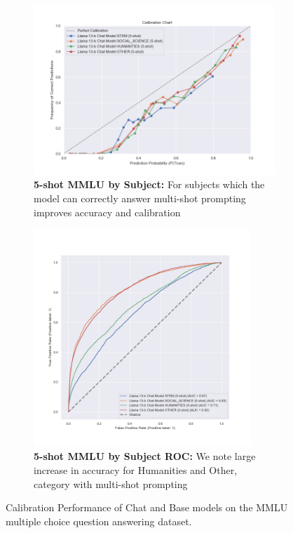 \documentclass[11pt]{article}
\begin{document}
\begin{figure}
     \hfill
     \begin{subfigure}[b]{0.60\textwidth}
         \centering
         \includegraphics[width=1.1\textwidth]{figures/5-shot-MMLU-subjects.png}
         \caption{\textbf{5-shot MMLU by Subject:}  For subjects which the model can correctly 
         answer multi-shot prompting improves accuracy and calibration}
         \label{fig:5-shot-logicqa}
     \end{subfigure}     
    \hfill 
     \begin{subfigure}[b]{0.38\textwidth}
         \centering \includegraphics[width=0.9\textwidth]{figures/5-shot-MMLU-subjects-roc.png}
         \caption{\textbf{5-shot MMLU by Subject ROC:} We note large increase in accuracy for 
         Humanities and Other, category with multi-shot prompting}
         \label{fig:0-shot-MMLU}
    \end{subfigure} 
    
        \caption{Calibration Performance of Chat and Base models on the MMLU multiple choice question answering dataset.}
        \label{fig:three graphs}
\end{figure}
\end{document}
